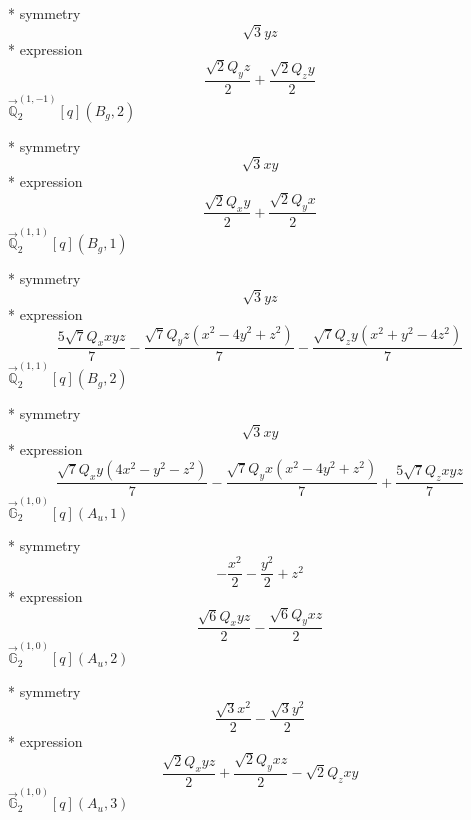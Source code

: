\documentclass[fleqn,8pt]{jsarticle}
\begin{document}
\noindent\quad ** symmetry
\begin{dmath*}
\sqrt{3} y z
\end{dmath*}
\noindent\quad ** expression
\begin{dmath*}
\frac{\sqrt{2} Q_{y} z}{2} + \frac{\sqrt{2} Q_{z} y}{2}
\end{dmath*}
\noindent\quad $\vec{\mathbb{Q}}_{2}^{(1,-1)}[q](B_{g},2)$

\noindent\quad ** symmetry
\begin{dmath*}
\sqrt{3} x y
\end{dmath*}
\noindent\quad ** expression
\begin{dmath*}
\frac{\sqrt{2} Q_{x} y}{2} + \frac{\sqrt{2} Q_{y} x}{2}
\end{dmath*}
\noindent\quad $\vec{\mathbb{Q}}_{2}^{(1,1)}[q](B_{g},1)$

\noindent\quad ** symmetry
\begin{dmath*}
\sqrt{3} y z
\end{dmath*}
\noindent\quad ** expression
\begin{dmath*}
\frac{5 \sqrt{7} Q_{x} x y z}{7} - \frac{\sqrt{7} Q_{y} z \left(x^{2} - 4 y^{2} + z^{2}\right)}{7} - \frac{\sqrt{7} Q_{z} y \left(x^{2} + y^{2} - 4 z^{2}\right)}{7}
\end{dmath*}
\noindent\quad $\vec{\mathbb{Q}}_{2}^{(1,1)}[q](B_{g},2)$

\noindent\quad ** symmetry
\begin{dmath*}
\sqrt{3} x y
\end{dmath*}
\noindent\quad ** expression
\begin{dmath*}
\frac{\sqrt{7} Q_{x} y \left(4 x^{2} - y^{2} - z^{2}\right)}{7} - \frac{\sqrt{7} Q_{y} x \left(x^{2} - 4 y^{2} + z^{2}\right)}{7} + \frac{5 \sqrt{7} Q_{z} x y z}{7}
\end{dmath*}
\noindent\quad $\vec{\mathbb{G}}_{2}^{(1,0)}[q](A_{u},1)$

\noindent\quad ** symmetry
\begin{dmath*}
- \frac{x^{2}}{2} - \frac{y^{2}}{2} + z^{2}
\end{dmath*}
\noindent\quad ** expression
\begin{dmath*}
\frac{\sqrt{6} Q_{x} y z}{2} - \frac{\sqrt{6} Q_{y} x z}{2}
\end{dmath*}
\noindent\quad $\vec{\mathbb{G}}_{2}^{(1,0)}[q](A_{u},2)$

\noindent\quad ** symmetry
\begin{dmath*}
\frac{\sqrt{3} x^{2}}{2} - \frac{\sqrt{3} y^{2}}{2}
\end{dmath*}
\noindent\quad ** expression
\begin{dmath*}
\frac{\sqrt{2} Q_{x} y z}{2} + \frac{\sqrt{2} Q_{y} x z}{2} - \sqrt{2} Q_{z} x y
\end{dmath*}
\noindent\quad $\vec{\mathbb{G}}_{2}^{(1,0)}[q](A_{u},3)$
\end{document}

